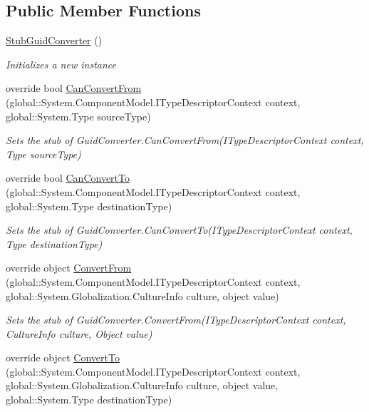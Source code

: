 \subsection*{Public Member Functions}
\begin{DoxyCompactItemize}
\item 
\hyperlink{class_system_1_1_component_model_1_1_fakes_1_1_stub_guid_converter_a648524eb2e1091cac2ed7673f57799bf}{Stub\-Guid\-Converter} ()
\begin{DoxyCompactList}\small\item\em Initializes a new instance\end{DoxyCompactList}\item 
override bool \hyperlink{class_system_1_1_component_model_1_1_fakes_1_1_stub_guid_converter_a8e56503c2e57acbd8196e38c78c5b499}{Can\-Convert\-From} (global\-::\-System.\-Component\-Model.\-I\-Type\-Descriptor\-Context context, global\-::\-System.\-Type source\-Type)
\begin{DoxyCompactList}\small\item\em Sets the stub of Guid\-Converter.\-Can\-Convert\-From(\-I\-Type\-Descriptor\-Context context, Type source\-Type)\end{DoxyCompactList}\item 
override bool \hyperlink{class_system_1_1_component_model_1_1_fakes_1_1_stub_guid_converter_aa38d2ec2913098fd332b8aaa52c8e931}{Can\-Convert\-To} (global\-::\-System.\-Component\-Model.\-I\-Type\-Descriptor\-Context context, global\-::\-System.\-Type destination\-Type)
\begin{DoxyCompactList}\small\item\em Sets the stub of Guid\-Converter.\-Can\-Convert\-To(\-I\-Type\-Descriptor\-Context context, Type destination\-Type)\end{DoxyCompactList}\item 
override object \hyperlink{class_system_1_1_component_model_1_1_fakes_1_1_stub_guid_converter_a677e0a448404614d7a1244becda63265}{Convert\-From} (global\-::\-System.\-Component\-Model.\-I\-Type\-Descriptor\-Context context, global\-::\-System.\-Globalization.\-Culture\-Info culture, object value)
\begin{DoxyCompactList}\small\item\em Sets the stub of Guid\-Converter.\-Convert\-From(\-I\-Type\-Descriptor\-Context context, Culture\-Info culture, Object value)\end{DoxyCompactList}\item 
override object \hyperlink{class_system_1_1_component_model_1_1_fakes_1_1_stub_guid_converter_a228b66fae410befc7cc790aef1f3af1e}{Convert\-To} (global\-::\-System.\-Component\-Model.\-I\-Type\-Descriptor\-Context context, global\-::\-System.\-Globalization.\-Culture\-Info culture, object value, global\-::\-System.\-Type destination\-Type)

\end{DoxyCompactItemize}
